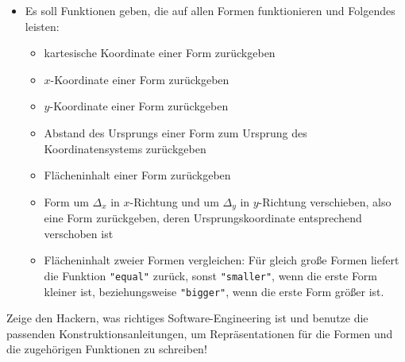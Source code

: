 \begin{aufgabe}
\begin{itemize}
  \item Es soll Funktionen geben, die auf allen Formen funktionieren
    und Folgendes leisten:

    \begin{itemize}

    \item kartesische Koordinate einer Form zurückgeben

    \item $x$-Koordinate einer Form zurückgeben

    \item $y$-Koordinate einer Form zurückgeben

    \item Abstand des Ursprungs einer Form zum Ursprung des
      Koordinatensystems zurückgeben

    \item Flächeninhalt einer Form zurückgeben

    \item Form um $\Delta_x$ in $x$-Richtung und um $\Delta_y$ in
      $y$-Richtung verschieben, also eine Form zurückgeben, deren
      Ursprungskoordinate entsprechend verschoben ist

  \item  Flächeninhalt zweier
    Formen vergleichen: Für gleich große Formen liefert die Funktion
    \verb|"equal"| zurück, sonst \verb|"smaller"|, wenn die erste
    Form kleiner ist, beziehungsweise \verb|"bigger"|, wenn die erste
    Form größer ist.
    \end{itemize}

  \end{itemize}
  Zeige den Hackern, was richtiges Software-Engineering ist und
  benutze die passenden Konstruktionsanleitungen, um Repräsentationen für die Formen und die zugehörigen
  Funktionen zu schreiben!
\end{aufgabe}

